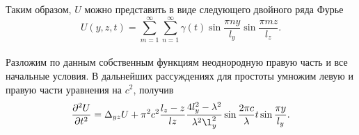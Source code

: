 Таким образом, $U$ можно представить в виде следующего двойного ряда Фурье
\[
U(y, z, t) = \displaystyle \sum_{m=1}^{\infty}\sum_{n=1}^{\infty} \gamma(t) \sin\frac{\pi n y}{l_y} \sin\frac{\pi m z}{l_z}.
\]
\\
Разложим по данным собственным функциям неоднородную правую часть и все начальные условия. В дальнейших рассуждениях для простоты умножим левую и правую части уравнения на $c^2$, получив
\[
\frac{\partial^2 U}{\partial t^2} = \Delta_{yz} U + \pi^2 c^2
\frac{l_z - z}{lz}\frac{4l_y^2 - \lambda^2}{\lambda^2
  \l_y^2}\sin\frac{2\pi c}{\lambda}t \sin\frac{\pi y}{l_y}.\\
\]
\\

